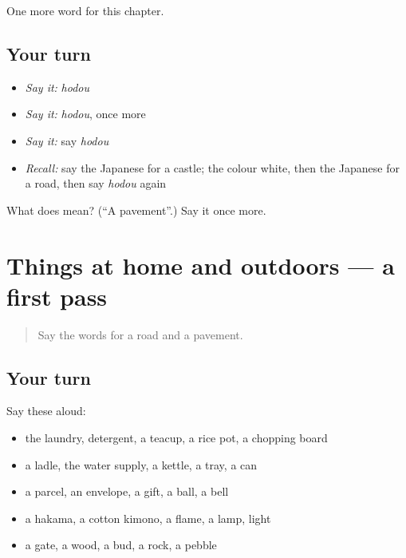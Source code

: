 \begin{grammarlens}[title={What you've built}]
One more word for this chapter.
\end{grammarlens}

\subsection*{Your turn}
\begin{itemize}
\raggedright
  \item \emph{Say it:} \emph{hodou}
  \item \emph{Say it:} \emph{hodou}, once more
  \item \emph{Say it:} say \emph{hodou}
  \item \emph{Recall:} say the Japanese for a castle; the colour white, then the Japanese for a road, then say \emph{hodou} again
\end{itemize}

\begin{tcolorbox}[breakable,colback=teal!4,colframe=teal!35!black,title={Before you move on}]
What does  mean? (\textquotedblleft{}A pavement\textquotedblright{}.) Say it once more.
\end{tcolorbox}
\section[(dialogue)]{Things at home and outdoors — a first pass}

\label{lesson:JA-R111-first-pass-things-at-home-and-outdoors}



\begin{quote}
Say the words for a road and a pavement.
\end{quote}

\subsection*{Your turn}
Say these aloud:

\begin{itemize}
\raggedright
  \item the laundry, detergent, a teacup, a rice pot, a chopping board
  \item a ladle, the water supply, a kettle, a tray, a can
  \item a parcel, an envelope, a gift, a ball, a bell
  \item a hakama, a cotton kimono, a flame, a lamp, light
  \item a gate, a wood, a bud, a rock, a pebble
\end{itemize}

